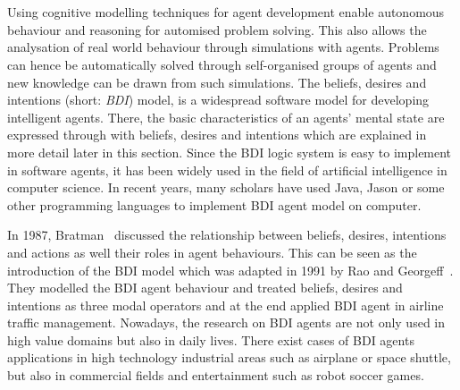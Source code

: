 \section{}%
Using cognitive modelling techniques for agent development enable autonomous behaviour and reasoning for automised problem solving.
This also allows the analysation of real world behaviour through simulations with agents.
Problems can hence be automatically solved through self-organised groups of agents and new knowledge can be drawn from such simulations.
The beliefs, desires and intentions (short: \emph{BDI}) model, is a widespread software model for developing intelligent agents.
There, the basic characteristics of an agents' mental state are expressed through with beliefs, desires and intentions which are explained in more detail later in this section.
Since the BDI logic system is easy to implement in software agents, it has been widely used in the field of artificial intelligence in computer science.
In recent years, many scholars have used Java, Jason or some other programming languages to implement BDI agent model on computer.

In 1987, Bratman~\cite{MICHAEL_PlansResource_1988} discussed the relationship between beliefs, desires, intentions and actions as well their roles in agent behaviours.
This can be seen as the introduction of the BDI model which was adapted in 1991 by Rao and Georgeff~\cite{rao_modeling_1991}.
They modelled the BDI agent behaviour and treated beliefs, desires and intentions as three modal operators and at the end applied BDI agent in airline traffic management.
Nowadays, the research on BDI agents are not only used in high value domains but also in daily lives.
There exist cases of BDI agents applications in high technology industrial areas such as airplane or space shuttle, but also in commercial fields and entertainment such as robot soccer games.

